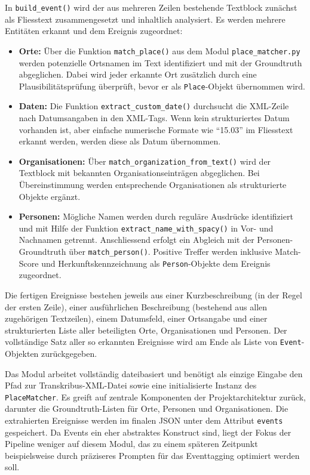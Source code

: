 \documentclass[12pt, a4paper, ngerman, bidi=default]{article}
\begin{document}
In \texttt{build\_event()} wird der aus mehreren Zeilen bestehende Textblock zunächst als Fliesstext zusammengesetzt 
und inhaltlich analysiert. Es werden mehrere Entitäten erkannt und dem Ereignis zugeordnet:

\begin{itemize}
  \item \textbf{Orte:} Über die Funktion \texttt{match\_place()} aus dem Modul \texttt{place\_matcher.py} werden potenzielle Ortsnamen im Text identifiziert und mit der Groundtruth abgeglichen. Dabei wird jeder erkannte Ort zusätzlich durch eine Plausibilitätsprüfung überprüft, bevor er als \texttt{Place}-Objekt übernommen wird.
  \item \textbf{Daten:} Die Funktion \texttt{extract\_custom\_date()} durchsucht die XML-Zeile nach Datumsangaben in den XML-Tags. Wenn kein strukturiertes Datum vorhanden ist, aber einfache numerische Formate wie \enquote{15.03} im Fliesstext erkannt werden, werden diese als Datum übernommen.
  \item \textbf{Organisationen:} Über \texttt{match\_organization\_from\_text()} wird der Textblock mit bekannten Organisationseinträgen abgeglichen. Bei Übereinstimmung werden entsprechende Organisationen als strukturierte Objekte ergänzt.
  \item \textbf{Personen:} Mögliche Namen werden durch reguläre Ausdrücke identifiziert und mit Hilfe der Funktion \texttt{extract\_name\_with\_spacy()} in Vor- und Nachnamen getrennt. Anschliessend erfolgt ein Abgleich mit der Personen-Groundtruth über \texttt{match\_person()}. Positive Treffer werden inklusive Match-Score und Herkunftskennzeichnung als \texttt{Person}-Objekte dem Ereignis zugeordnet.
\end{itemize}

Die fertigen Ereignisse bestehen jeweils aus einer Kurzbeschreibung (in der Regel der ersten Zeile), 
einer ausführlichen Beschreibung (bestehend aus allen zugehörigen Textzeilen), einem Datumsfeld, einer 
Ortsangabe und einer strukturierten Liste aller beteiligten Orte, Organisationen und Personen. Der vollständige 
Satz aller so erkannten Ereignisse wird am Ende als Liste von \texttt{Event}-Objekten zurückgegeben.

Das Modul arbeitet vollständig dateibasiert und benötigt als einzige Eingabe den Pfad zur Transkribus-XML-Datei 
sowie eine initialisierte Instanz des \texttt{PlaceMatcher}. Es greift auf zentrale Komponenten der Projektarchitektur 
zurück, darunter die Groundtruth-Listen für Orte, Personen und Organisationen. Die extrahierten Ereignisse werden 
im finalen JSON unter dem Attribut \texttt{events} gespeichert. Da Events ein eher abstraktes Konstruct sind, liegt der
Fokus der Pipeline weniger auf diesem Modul, das zu einem späteren Zeitpunkt beispielsweise durch präziseres Prompten für das
Eventtagging optimiert werden soll. 
\end{document}
